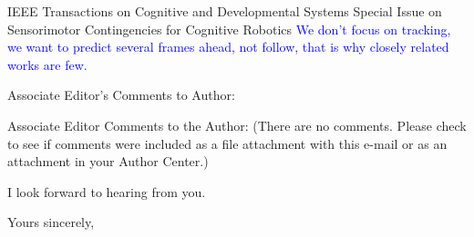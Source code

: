 \documentclass[a4paper,12pt]{letter}
\newcommand{\comment}[1]{\textcolor{blue}{#1}}
\begin{document}
\begin{letter}{IEEE Transactions on Cognitive and Developmental Systems\newline
Special Issue on Sensorimotor Contingencies for Cognitive Robotics}
\comment{We don't focus on tracking, we want to predict several frames ahead, not follow, that is why closely related works are few.}

Associate Editor's Comments to Author: 

Associate Editor 
Comments to the Author: 
(There are no comments. Please check to see if comments were included as a file attachment with this e-mail or as an attachment in your Author Center.)


I look forward to hearing from you.


\signature{Dra. Verónica Esther Arriola Ríos\\
Profesora Asociada C de T.C.\newline
Departamento de Matemáticas, Cub 119.\newline
Facultad de Ciencias, UNAM \newline
v.arriola@ciencias.unam.mx \newline
+(52)55 5622 5426}

\closing{Yours sincerely,}


\end{letter}
\end{document}
